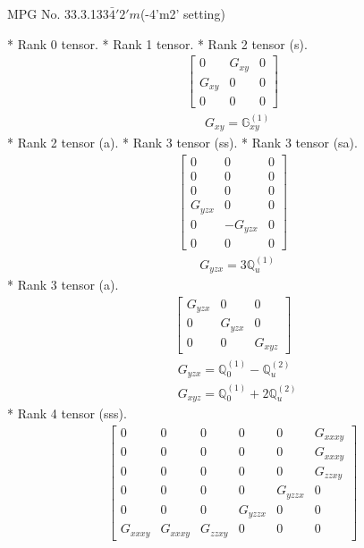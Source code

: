 \documentclass[fleqn,8pt,landscape]{jsarticle}
\begin{document}
\setcounter{MaxMatrixCols}{32}

\renewcommand{\tablename}{Table~}
\renewcommand{\figurename}{Figure~}
\begin{center}
\LARGE
MPG No. 33.3.133\quad$\bar{4}'2'm$\quad(-4'm2' setting)
\end{center}
* Rank 0 tensor.
* Rank 1 tensor.
* Rank 2 tensor (s).
\begin{align*}
\begin{bmatrix} 0 & G_{xy} & 0 \\ G_{xy} & 0 & 0 \\ 0 & 0 & 0 \end{bmatrix}
\end{align*}
\begin{align*}
& G_{xy} = \mathbb{G}_{xy}^{(1)}
\end{align*}
* Rank 2 tensor (a).
* Rank 3 tensor (ss).
* Rank 3 tensor (sa).
\begin{align*}
\begin{bmatrix} 0 & 0 & 0 \\ 0 & 0 & 0 \\ 0 & 0 & 0 \\ G_{yzx} & 0 & 0 \\ 0 & - G_{yzx} & 0 \\ 0 & 0 & 0 \end{bmatrix}
\end{align*}
\begin{align*}
& G_{yzx} = 3 \mathbb{Q}_{u}^{(1)}
\end{align*}
* Rank 3 tensor (a).
\begin{align*}
\begin{bmatrix} G_{yzx} & 0 & 0 \\ 0 & G_{yzx} & 0 \\ 0 & 0 & G_{xyz} \end{bmatrix}
\end{align*}
\begin{align*}
& G_{yzx} = \mathbb{Q}_{0}^{(1)} - \mathbb{Q}_{u}^{(2)} \\
& G_{xyz} = \mathbb{Q}_{0}^{(1)} + 2 \mathbb{Q}_{u}^{(2)}
\end{align*}
* Rank 4 tensor (sss).
\begin{align*}
\begin{bmatrix} 0 & 0 & 0 & 0 & 0 & G_{xxxy} \\ 0 & 0 & 0 & 0 & 0 & G_{xxxy} \\ 0 & 0 & 0 & 0 & 0 & G_{zzxy} \\ 0 & 0 & 0 & 0 & G_{yzzx} & 0 \\ 0 & 0 & 0 & G_{yzzx} & 0 & 0 \\ G_{xxxy} & G_{xxxy} & G_{zzxy} & 0 & 0 & 0 \end{bmatrix}
\end{align*}
\end{document}
